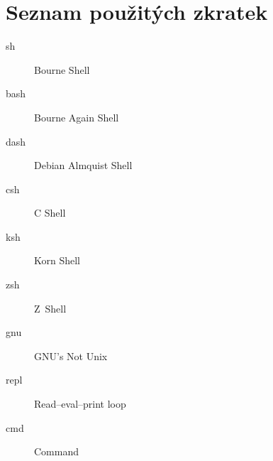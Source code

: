 \documentclass[thesis=M,czech]{FITthesis}[2012/06/26]
\begin{document}





\appendix

\chapter{Seznam použitých zkratek}
\begin{description}
	\item[sh] Bourne Shell
	\item[bash] Bourne Again Shell
	\item[dash] Debian Almquist Shell
	\item[csh] C Shell
	\item[ksh] Korn Shell
	\item[zsh] Z~Shell
	\item[gnu] GNU's Not Unix
	\item[repl] Read–eval–print loop
	\item[cmd] Command
\end{description}
\end{document}
